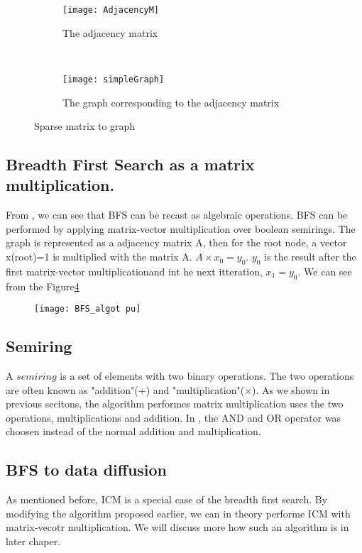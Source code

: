 {\begin{figure}
	\begin{subfigure}{0.5\textwidth}
	\texttt{[image: AdjacencyM]}
	\caption{The adjacency matrix}
	\label{fig:AdjacencyM}
	\end{subfigure}
	~
	\begin{subfigure}{0.5\textwidth}
	\texttt{[image: simpleGraph]}
	\caption{The graph corresponding to the adjacency matrix}
	\label{fig:matrix}
	\end{subfigure}
 	\caption{Sparse matrix to graph}
 	\label{AdjaToMatrix}
\end{figure}

\subsection{Breadth First Search as a matrix multiplication.}
From \cite{AlgoToMath}, we can see that BFS can be recast as algebraic operations. BFS can be performed by applying matrix-vector multiplication over boolean semirings\cite{HybridBFS2015}. The graph is represented as a adjacency matrix A, then for the root node, a vector x(root)=1 is multiplied with the matrix A. $A \times x_0 = y_0$. $y_0$ is the result after the first matrix-vector multiplicationand int he next itteration, $x_1 = y_0$. We can see from the Figure\ref{fig:bfsMatrix}

\begin{figure}
	
	\texttt{[image: BFS\_algot pu]}
	\label{fig:bfsMatrix}
\end{figure}



\subsection{Semiring}
A $semiring$ is a set of elements with two binary operations. The two operations are often known as "addition"(+) and "multiplication"($\times$).  As we shown in previous secitons, the algorithm performes matrix multiplication uses the two operations, multiplications and addition. In \cite{HYbridBFS2015}, the AND and OR operator was choosen instead of the normal addition and multiplication. 


\subsection{BFS to data diffusion}
As mentioned before, ICM is a special case of the breadth first search. By modifying the algorithm proposed earlier, we can in theory performe ICM with matrix-vecotr multiplication. We will discuss more how such an algorithm is in later chaper. 


}
